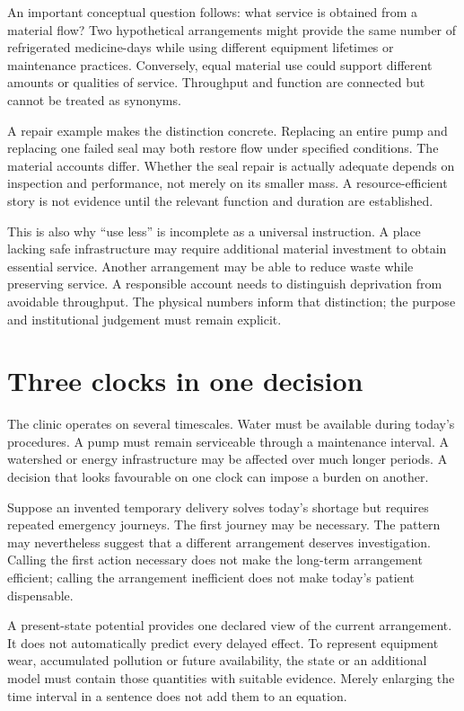 An important conceptual question follows: what service is obtained from a material flow? Two hypothetical arrangements might provide the same number of refrigerated medicine-days while using different equipment lifetimes or maintenance practices. Conversely, equal material use could support different amounts or qualities of service. Throughput and function are connected but cannot be treated as synonyms.

A repair example makes the distinction concrete. Replacing an entire pump and replacing one failed seal may both restore flow under specified conditions. The material accounts differ. Whether the seal repair is actually adequate depends on inspection and performance, not merely on its smaller mass. A resource-efficient story is not evidence until the relevant function and duration are established.

This is also why ``use less'' is incomplete as a universal instruction. A place lacking safe infrastructure may require additional material investment to obtain essential service. Another arrangement may be able to reduce waste while preserving service. A responsible account needs to distinguish deprivation from avoidable throughput. The physical numbers inform that distinction; the purpose and institutional judgement must remain explicit.

\section{Three clocks in one decision}
The clinic operates on several timescales. Water must be available during today's procedures. A pump must remain serviceable through a maintenance interval. A watershed or energy infrastructure may be affected over much longer periods. A decision that looks favourable on one clock can impose a burden on another.

Suppose an invented temporary delivery solves today's shortage but requires repeated emergency journeys. The first journey may be necessary. The pattern may nevertheless suggest that a different arrangement deserves investigation. Calling the first action necessary does not make the long-term arrangement efficient; calling the arrangement inefficient does not make today's patient dispensable.

A present-state potential provides one declared view of the current arrangement. It does not automatically predict every delayed effect. To represent equipment wear, accumulated pollution or future availability, the state or an additional model must contain those quantities with suitable evidence. Merely enlarging the time interval in a sentence does not add them to an equation.


